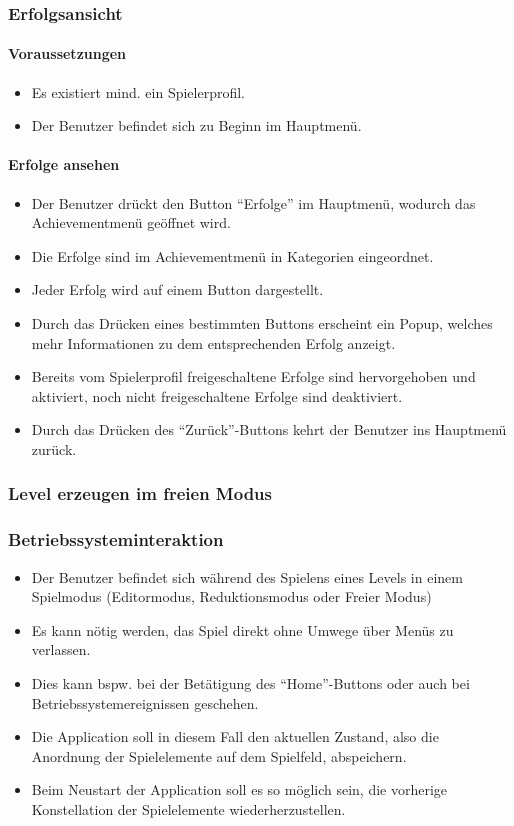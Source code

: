 \subsubsection{Erfolgsansicht}
\paragraph{Voraussetzungen}
\begin{itemize}
	\item Es existiert mind. ein Spielerprofil.
	\item Der Benutzer befindet sich zu Beginn im Hauptmenü.
\end{itemize}
\paragraph{Erfolge ansehen}
\begin{itemize}
	\item Der Benutzer drückt den Button "`Erfolge"' im Hauptmenü, wodurch das Achievementmenü geöffnet wird.
	\item Die Erfolge sind im Achievementmenü in Kategorien eingeordnet.
	\item Jeder Erfolg wird auf einem Button dargestellt.
	\item Durch das Drücken eines bestimmten Buttons erscheint ein Popup, welches mehr Informationen zu dem entsprechenden Erfolg anzeigt.
	\item Bereits vom Spielerprofil freigeschaltene Erfolge sind hervorgehoben und aktiviert, noch nicht freigeschaltene Erfolge sind deaktiviert.
	\item Durch das Drücken des "`Zurück"'-Buttons kehrt der Benutzer ins Hauptmenü zurück.
\end{itemize}

\subsubsection{Level erzeugen im freien Modus}

\subsubsection{Betriebssysteminteraktion}
\begin{itemize}
	\item Der Benutzer befindet sich während des Spielens eines Levels in einem Spielmodus (Editormodus, Reduktionsmodus oder Freier Modus)
	\item Es kann nötig werden, das Spiel direkt ohne Umwege über Menüs zu verlassen.
	\item Dies kann bspw. bei der Betätigung des "`Home"'-Buttons  oder auch bei Betriebssystemereignissen geschehen.
	\item Die Application soll in diesem Fall den aktuellen Zustand, also die Anordnung der Spielelemente auf dem Spielfeld, abspeichern.
	\item Beim Neustart der Application soll es so möglich sein, die vorherige Konstellation der Spielelemente wiederherzustellen.
\end{itemize}
